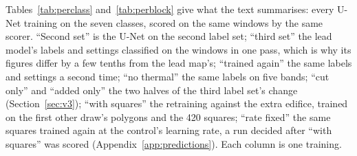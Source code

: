 \documentclass[twocolumn]{aastex701}
\begin{document}
Tables~\ref{tab:perclass} and~\ref{tab:perblock} give what the text summarises: every U-Net training on the seven
classes, scored on the same windows by the same scorer. ``Second set'' is the U-Net on the second label set;
``third set'' the lead model's labels and settings classified on the windows in one pass, which is why its figures
differ by a few tenths from the lead map's; ``trained again'' the same labels and settings a second time; ``no
thermal'' the same labels on five bands; ``cut only'' and ``added only'' the two halves of the third label set's
change (Section~\ref{sec:v3}); ``with squares'' the retraining against the extra edifice, trained on the first
other draw's polygons and the 420 squares; ``rate fixed'' the same squares trained again at the control's learning
rate, a run decided after ``with squares'' was scored (Appendix~\ref{app:predictions}). Each column is one training. %
\end{document}
